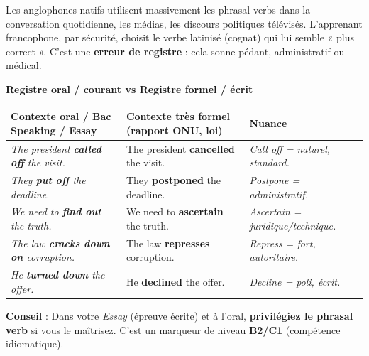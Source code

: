 \documentclass[11pt]{article}
\newcommand{\eng}[1]{\ifmmode\text{\textit{#1}}\else\begingroup\selectlanguage{english}\itshape #1\endgroup\fi}
\begin{document}
\begin{attention}
Les anglophones natifs utilisent massivement les phrasal verbs dans la conversation quotidienne, les médias, les discours politiques télévisés. L'apprenant francophone, par sécurité, choisit le verbe latinisé (cognat) qui lui semble « plus correct ». C'est une \textbf{erreur de registre} : cela sonne pédant, administratif ou médical.

\textbf{Registre oral / courant vs Registre formel / écrit}
\begin{center}
\begin{tabular}{|l|l|l|}
\hline
\rowcolor{popgreenL} \textbf{Contexte oral / Bac Speaking / Essay} & \textbf{Contexte très formel (rapport ONU, loi)} & \textbf{Nuance} \\
\hline
\eng{The president \textbf{called off} the visit.} & The president \textbf{cancelled} the visit. & \eng{Call off} = naturel, standard. \\
\eng{They \textbf{put off} the deadline.} & They \textbf{postponed} the deadline. & \eng{Postpone} = administratif. \\
\eng{We need to \textbf{find out} the truth.} & We need to \textbf{ascertain} the truth. & \eng{Ascertain} = juridique/technique. \\
\eng{The law \textbf{cracks down on} corruption.} & The law \textbf{represses} corruption. & \eng{Repress} = fort, autoritaire. \\
\eng{He \textbf{turned down} the offer.} & He \textbf{declined} the offer. & \eng{Decline} = poli, écrit. \\
\hline
\end{tabular}
\end{center}
\textbf{Conseil} : Dans votre \emph{Essay} (épreuve écrite) et à l'oral, \textbf{privilégiez le phrasal verb} si vous le maîtrisez. C'est un marqueur de niveau \textbf{B2/C1} (compétence idiomatique).
\end{attention}
\end{document}
